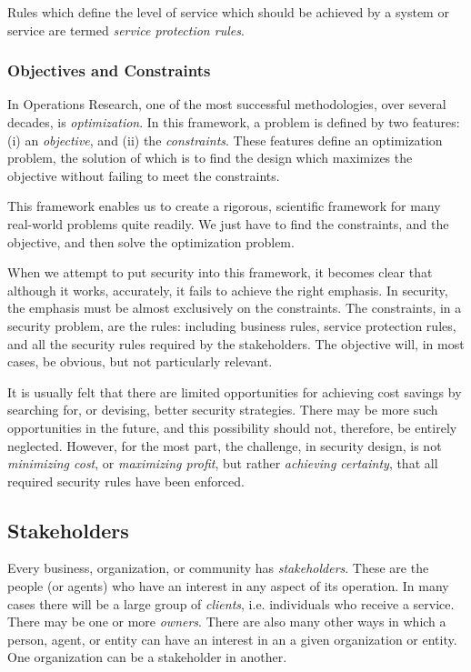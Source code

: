 Rules which define the level of service which should be achieved by a system or service are termed {\em service protection rules}.

\subsubsection{Objectives and Constraints}

In Operations Research, one of the most successful methodologies, over several decades, is {\em optimization}. In this framework, a problem is defined by two features: (i) an {\em objective}, and (ii) the {\em constraints}. These features define an optimization problem, the solution of which is to find the design which maximizes the objective without failing to meet the constraints.

This framework enables us to create a rigorous, scientific framework for many real-world problems quite readily. We just have to find the constraints, and the objective, and then solve the optimization problem.

When we attempt to put security into this framework, it becomes clear that although it works, accurately, it fails to achieve the right emphasis. In security, the emphasis must be almost exclusively on the constraints. The constraints, in a security problem, are the rules: including business rules, service protection rules, and all the security rules required by the stakeholders. The objective will, in most cases, be obvious, but not particularly relevant.

It is usually felt that there are limited opportunities for achieving cost savings by searching for, or devising, better security strategies. There may be more such opportunities in the future, and this possibility should not, therefore, be entirely neglected. However, for the most part, the challenge, in security design, is not {\em minimizing cost}, or {\em maximizing profit}, but rather {\em achieving certainty}, that all required security rules have been enforced.
\fi

\subsection{Stakeholders}

Every business, organization, or community has {\em stakeholders}. These are the people (or agents) who have
an interest in any aspect of its operation. In many cases there will be a large group of {\em clients}, i.e. 
individuals who receive a service. There may be one or more {\em owners}. There are also many other ways
in which a person, agent, or entity can have an interest in an a given organization or entity. One organization
can be a stakeholder in another.

